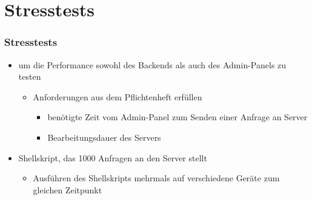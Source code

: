 \section*{Stresstests}

\begin{frame}\frametitle{Stresstests}
    \begin{itemize}
        \item um die Performance sowohl des Backends als auch des Admin-Panels zu testen
        \begin{itemize}
        		\item Anforderungen aus dem Pflichtenheft erfüllen
        		\begin{itemize}
        			\item {benötigte Zeit vom Admin-Panel zum Senden einer Anfrage an Server}
        			\item {Bearbeitungsdauer des Servers}
        		\end{itemize}
        \end{itemize}
        \item Shellskript, das 1000 Anfragen an den Server stellt
        	\begin{itemize}
        		\item Ausführen des Shellskripts mehrmals auf verschiedene Geräte zum gleichen Zeitpunkt
        	\end{itemize}
    \end{itemize}
\end{frame}

